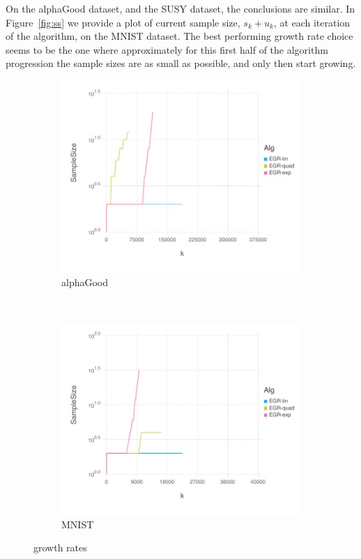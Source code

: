 \documentclass[11pt]{article}
\begin{document}
	     On the alphaGood dataset, and the SUSY dataset, the conclusions are similar. In Figure~\ref{fig:ss} we provide a plot of current sample size, $s_k+u_k$, at each iteration of the algorithm, on the MNIST dataset. The best performing growth rate choice seems to be the one where approximately for this first half of the algorithm progression the sample sizes are as small as possible, and only then start growing.
  
 
  \begin{figure}[H]
      \centering
      \begin{subfigure}[b]{0.45\textwidth}
          \includegraphics[width=\textwidth]{Figures/alphaGoodBLtrueSampleSizefFinal.pdf}
          \caption{alphaGood}
      \end{subfigure}
      ~ 
        \begin{subfigure}[b]{0.45\textwidth}
          \includegraphics[width=\textwidth]{Figures/MNISTBLtrueSampleSizefFinal.pdf}
            \caption{MNIST}
        \end{subfigure}
      \caption{growth rates}\label{fig:alphaGoodsummary}
  \end{figure}
  
\end{document}
